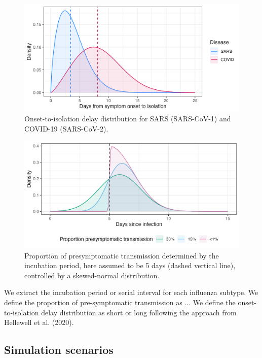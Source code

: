 \documentclass{article}
\begin{document}
\begin{figure}[h]
  \centering
  \includegraphics[width=\textwidth]{../plots/onset_to_isolation.png}
  \caption{Onset-to-isolation delay distribution for SARS (SARS-CoV-1) and
  COVID-19 (SARS-CoV-2).}
  \label{fig:onset-to-isolation}
\end{figure}


\begin{figure}[h]
  \centering
  \includegraphics[width=\textwidth]{../plots/prop_presymptomatic_transmission.png}
  \caption{Proportion of presymptomatic transmission determined by the incubation period, here assumed to be 5 days (dashed vertical line), controlled by a skewed-normal distribution.}
  \label{fig:prop-presym-trans}
\end{figure}

We extract the incubation period or serial interval for each influenza subtype. We define the proportion of pre-symptomatic transmission as ... We define the onset-to-isolation delay distribution as short or long following the approach from Hellewell et al. (2020).

\subsection{Simulation scenarios}
\end{document}
